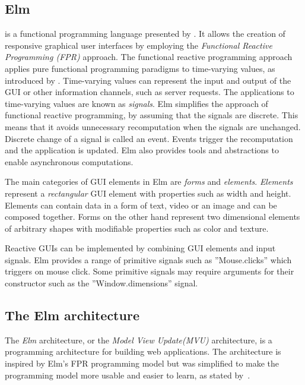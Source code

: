 \subsection{Elm}
\citet{elm} is a functional programming language presented by \citet{Czaplicki_Chong_2013}.
It allows the creation of responsive graphical user interfaces by employing the
\emph{Functional Reactive Programming (FPR)} approach.
The functional reactive programming approach applies pure functional programming paradigms to time-varying values, as introduced by \citet{Elliott_Hudak_1997}.
Time-varying values can represent the input and output of the GUI or other information
channels, such as server requests. The applications to time-varying values are known
as \emph{signals}. Elm simplifies the approach of functional reactive programming,
by assuming that the signals are discrete. This means that it avoids unnecessary
recomputation when the signals are unchanged. Discrete change of a signal is called
an event. Events trigger the recomputation and the application is updated. Elm also
provides tools and abstractions to enable asynchronous computations.

The main categories of GUI elements in Elm are \emph{forms} and \emph{elements}.
\emph{Elements} represent a \emph{rectangular} GUI element with properties such as width and height. Elements
can contain data in a form of text, video or an image and can be composed together.
Forms on the other hand represent two dimensional elements of arbitrary shapes with
modifiable properties such as color and texture.

Reactive GUIs can be implemented by combining GUI elements and input signals.
Elm provides a range of primitive signals such as ”Mouse.clicks” which triggers on
mouse click. Some primitive signals may require arguments for their constructor such
as the ”Window.dimensions” signal.

\subsection{The Elm architecture}
\label{sub:elmish}

The \emph{Elm} architecture\citet{elm-arch}, or the \emph{Model View Update(MVU)} architecture, is a programming architecture for building web applications.
The architecture is inspired by Elm's FPR programming model but was simplified to make the programming model more usable and easier to learn, as stated by~\citet{news/farewell-to-frp_2024}.

